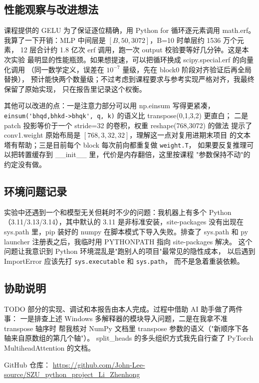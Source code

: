 \documentclass[a4paper,12pt]{article}
\begin{document}
\subsection{性能观察与改进想法}

课程提供的 GELU 为了保证逐位精确，用 Python for 循环逐元素调用 math.erf。
我算了一下开销：MLP 中间层是 $[B,50,3072]$，B=10 时单层约 1536 万个元素，
12 层合计约 1.8 亿次 erf 调用，跑一次 output 校验要等好几分钟。这是本次实验
最明显的性能瓶颈。如果想提速，可以把循环换成 scipy.special.erf 的向量化调用
（同一数学定义，误差在 $10^{-7}$ 量级，先在 block0 阶段对齐验证后再全局替换），
预计能快两个数量级；不过考虑到课程要求与参考实现严格对齐，我最终保留了原始实现，
只在报告里记录这个权衡。

其他可以改进的点：一是注意力部分可以用 np.einsum 写得更紧凑，
\verb|einsum('bhqd,bhkd->bhqk', q, k)| 的语义比 transpose(0,1,3,2) 更直白；
二是 patch 投影等价于一个 stride=32 的卷积，权重 reshape(768,3072) 的做法
提示了 conv1.weight 原始布局是 $[768,3,32,32]$，理解这一点对复用进期末项目
的文本塔有帮助；三是目前每个 block 每次前向都重复做 \verb|weight.T|，
如果要反复推理可以把转置缓存到 \_\_init\_\_ 里，代价是内存翻倍，这里按课程
"参数保持不动"的约定没有做。

\subsection{环境问题记录}

实验中还遇到一个和模型无关但耗时不少的问题：我机器上有多个 Python
（3.11/3.13/3.14），其中默认的 3.11 是非标准安装，site-packages 没有出现在
sys.path 里，pip 装好的 numpy 在脚本模式下导入失败。排查了 sys.path 和
py launcher 注册表之后，我临时用 PYTHONPATH 指向 site-packages 解决。
这个问题让我意识到 Python 环境混乱是"跑别人的项目"最常见的隐性成本，
以后遇到 ImportError 应该先打 \verb|sys.executable| 和 \verb|sys.path|，
而不是急着重装依赖。

\subsection{协助说明}

TODO 部分的实现、调试和本报告由本人完成。过程中借助 AI 助手做了两件事：
一是排查上述 Windows 多解释器的模块导入问题，二是在我拿不准 transpose 轴序时
帮我核对 NumPy 文档里 transpose 参数的语义（"新顺序下各轴来自原数组的第几个轴"）。
split\_heads 的多头组织方式我先自行查了 PyTorch MultiheadAttention 的文档。

 GitHub 仓库：
\url{https://github.com/John-Lee-source/SZU_python_project_Li_Zhenhong}
\end{document}
